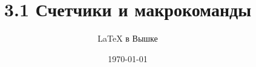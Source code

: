 \documentclass{article}
\begin{document}
\usepackage{array,tabularx,tabulary,booktabs} %
\usepackage{longtable}  %
\usepackage{multirow} %

\theoremstyle{plain} %
\newtheorem{theorem}{Теорема}[section]
\newtheorem{proposition}[theorem]{Утверждение}
 
\theoremstyle{definition} %
\newtheorem{corollary}{Следствие}[theorem]
\newtheorem{problem}{Задача}[section]
 
\theoremstyle{remark} %
\newtheorem*{nonum}{Решение}

\usepackage{etoolbox} %

\author{\LaTeX{} в Вышке}
\title{3.1 Счетчики и макрокоманды}
\date{\today}
\end{document}
